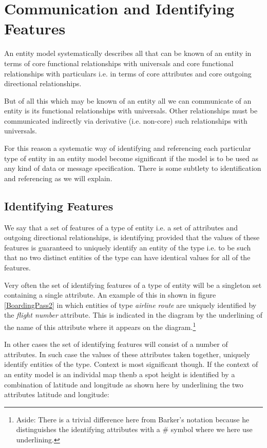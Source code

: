 \section{Communication and Identifying Features}

\mynote An entity model systematically describes all that can be known of an entity
in terms of core functional relationships with universals and core functional relationships with particulars i.e. in terms of core attributes and core outgoing directional relationships.

\mynote But of all this which  may be known of an entity all we can communicate of an entity is its functional relationships with universals. Other relationships must be communicated indirectly via derivative (i.e. non-core) such relationships with universals. 

\mynote For this reason a systematic way of identifying and referencing each particular type  of entity in an entity model become significant if the model is to be used as any kind of data or message specification. There is some subtlety to identification and referencing as we will explain.

\subsection*{Identifying Features}
\mynote We say that a set of features of a type of entity i.e. a set of attributes and outgoing directional relationships, is identifying provided that the values of these features is guaranteed to uniquely identify an entity of the type i.e. to be such that no two distinct entities of the type can have identical values for all of the features.

\mynote Very often the set of identifying features of a type of entity will be a singleton set containing a single attribute. An example of this 
in  shown in figure \ref{BoardingPass2} in which entities of type \textit{airline route} are uniquely identified by the \textit{flight number} attribute. This is
indicated in the diagram  by the underlining of the name of this attribute where it appears on the diagram.\footnote{Aside: There is a trivial difference here from Barker's notation because he distinguishes the identifying attributes with a \# symbol where we here use  underlining.} 

\mynote In other cases the set of identifying features will consist of a number of attributes. In such case  the values of these attributes taken together, uniquely identify entities of the type. Context is most significant though.
If the context of an entity model is an individal map thenb a spot height is identified by a combination of latitude and longitude as shown here by underlining the two attributes latitude and longitude: 

